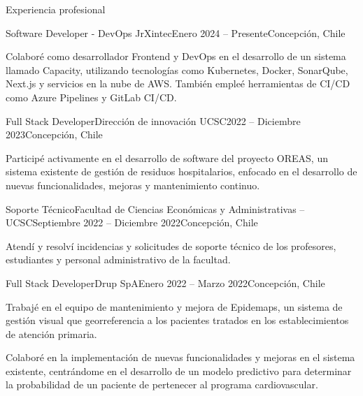 \begin{section}{Experiencia profesional}
      
    \begin{subsection}{Software Developer - DevOps Jr}{Xintec}{Enero 2024 -- Presente}{Concepción, Chile}
    {
    \item Colaboré como desarrollador Frontend y DevOps en el desarrollo de un sistema llamado Capacity, utilizando tecnologías como Kubernetes, Docker, SonarQube, Next.js y servicios en la nube de AWS. También empleé herramientas de CI/CD como Azure Pipelines y GitLab CI/CD.
    } 
    \end{subsection}

    \begin{subsection}{Full Stack Developer}{Dirección de innovación UCSC}{2022 -- Diciembre 2023}{Concepción, Chile}
    {
    \item Participé activamente en el desarrollo de software del proyecto OREAS, un sistema existente de gestión de residuos hospitalarios, enfocado en el desarrollo de nuevas funcionalidades, mejoras y mantenimiento continuo.
    }
    \end{subsection}
    
    \begin{subsection}{Soporte Técnico}{Facultad de Ciencias Económicas y Administrativas – UCSC}{Septiembre 2022 -- Diciembre 2022}{Concepción, Chile}
    {
    \item Atendí y resolví incidencias y solicitudes de soporte técnico de los profesores, estudiantes y personal administrativo de la facultad.
    }  
    \end{subsection}
    
    \begin{subsection}{Full Stack Developer}{Drup SpA}{Enero 2022 -- Marzo 2022}{Concepción, Chile}
    {
    \item Trabajé en el equipo de mantenimiento y mejora de Epidemaps, un sistema de gestión visual que georreferencia a los pacientes tratados en los establecimientos de atención primaria.
    \item Colaboré en la implementación de nuevas funcionalidades y mejoras en el sistema existente, centrándome en el desarrollo de un modelo predictivo para determinar la probabilidad de un paciente de pertenecer al programa cardiovascular.
    } 
    \end{subsection}
    
\end{section}